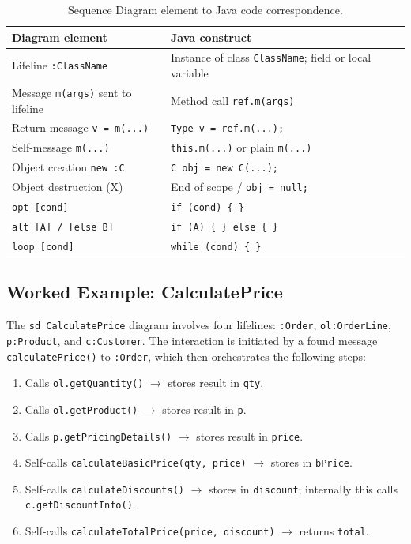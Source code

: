 \documentclass[11pt, a4paper, notitlepage]{report}
\theoremstyle{definition}
\theoremstyle{remark}
\theoremstyle{definition}
\begin{document}
\begin{table}[h]
\centering
\begin{tabular}{@{}ll@{}}
\toprule
\textbf{Diagram element} & \textbf{Java construct} \\
\midrule
Lifeline \texttt{:ClassName}              & Instance of class \texttt{ClassName}; field or local variable \\
Message \texttt{m(args)} sent to lifeline & Method call \texttt{ref.m(args)} \\
Return message \texttt{v = m(...)}        & \texttt{Type v = ref.m(...);} \\
Self-message \texttt{m(...)}              & \texttt{this.m(...)} or plain \texttt{m(...)} \\
Object creation \texttt{new :C}           & \texttt{C obj = new C(...);} \\
Object destruction (X)                    & End of scope / \texttt{obj = null;} \\
\texttt{opt [cond]}                       & \texttt{if (cond) \{ \}} \\
\texttt{alt [A] / [else B]}              & \texttt{if (A) \{ \} else \{ \}} \\
\texttt{loop [cond]}                      & \texttt{while (cond) \{ \}} \\
\bottomrule
\end{tabular}
\caption{Sequence Diagram element to Java code correspondence.}
\label{tab:ch7-d2c}
\end{table}

\subsection{Worked Example: CalculatePrice}
\label{subsec:ch7-calculateprice}

The \texttt{sd CalculatePrice} diagram involves four lifelines: \texttt{:Order},
\texttt{ol:OrderLine}, \texttt{p:Product}, and \texttt{c:Customer}. The
interaction is initiated by a found message \texttt{calculatePrice()} to
\texttt{:Order}, which then orchestrates the following steps:

\begin{enumerate}
  \item Calls \texttt{ol.getQuantity()} $\rightarrow$ stores result in \texttt{qty}.
  \item Calls \texttt{ol.getProduct()} $\rightarrow$ stores result in \texttt{p}.
  \item Calls \texttt{p.getPricingDetails()} $\rightarrow$ stores result in \texttt{price}.
  \item Self-calls \texttt{calculateBasicPrice(qty, price)} $\rightarrow$ stores in \texttt{bPrice}.
  \item Self-calls \texttt{calculateDiscounts()} $\rightarrow$ stores in \texttt{discount};
        internally this calls \texttt{c.getDiscountInfo()}.
  \item Self-calls \texttt{calculateTotalPrice(price, discount)} $\rightarrow$ returns \texttt{total}.
\end{enumerate}
\end{document}
